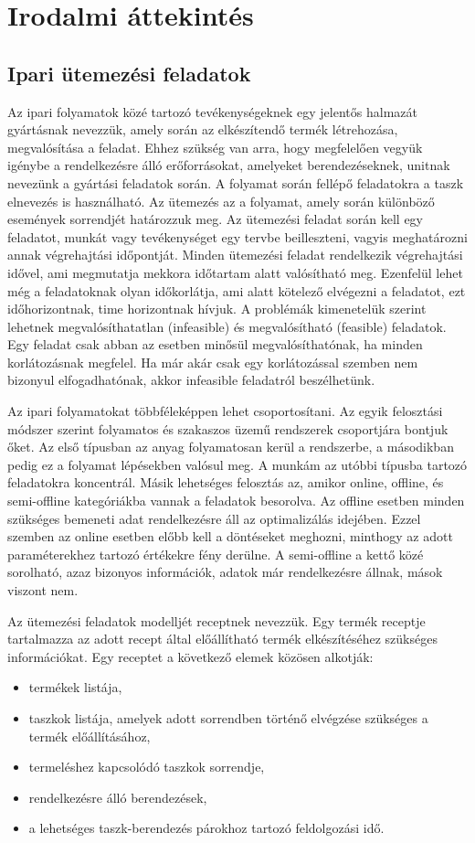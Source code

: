 \chapter{Irodalmi áttekintés}
\section{Ipari ütemezési feladatok}
Az ipari folyamatok közé tartozó tevékenységeknek egy jelentős halmazát gyártásnak nevezzük, amely során az elkészítendő termék létrehozása, megvalósítása a feladat.
Ehhez szükség van arra, hogy megfelelően vegyük igénybe a rendelkezésre álló erőforrásokat, amelyeket berendezéseknek, unitnak nevezünk a gyártási feladatok során.
A folyamat során fellépő feladatokra a taszk elnevezés is használható.
Az ütemezés az a folyamat, amely során különböző események sorrendjét határozzuk meg.
Az ütemezési feladat során kell egy feladatot, munkát vagy tevékenységet egy tervbe beilleszteni, vagyis meghatározni annak végrehajtási időpontját.
Minden ütemezési feladat rendelkezik végrehajtási idővel, ami megmutatja mekkora időtartam alatt valósítható meg.
Ezenfelül lehet még a feladatoknak olyan időkorlátja, ami alatt kötelező elvégezni a feladatot, ezt időhorizontnak, time horizontnak hívjuk.
A problémák kimenetelük szerint lehetnek megvalósíthatatlan (infeasible) és megvalósítható (feasible) feladatok.
Egy feladat csak abban az esetben minősül megvalósíthatónak, ha minden korlátozásnak megfelel.
Ha már akár csak egy korlátozással szemben nem bizonyul elfogadhatónak, akkor infeasible feladatról beszélhetünk.

Az ipari folyamatokat többféleképpen lehet csoportosítani.
Az egyik felosztási módszer szerint folyamatos és szakaszos üzemű rendszerek csoportjára bontjuk őket.
Az első típusban az anyag folyamatosan kerül a rendszerbe, a másodikban pedig ez a folyamat lépésekben valósul meg.
A munkám az utóbbi típusba tartozó feladatokra koncentrál.
Másik lehetséges felosztás az, amikor online, offline, és semi-offline kategóriákba vannak a feladatok besorolva.
Az offline esetben minden szükséges bemeneti adat rendelkezésre áll az optimalizálás idejében.
Ezzel szemben az online esetben előbb kell a döntéseket meghozni, minthogy az adott paraméterekhez tartozó értékekre fény derülne.
A semi-offline a kettő közé sorolható, azaz bizonyos információk, adatok már rendelkezésre állnak, mások viszont nem.

Az ütemezési feladatok modelljét receptnek nevezzük.
Egy termék receptje tartalmazza az adott recept által előállítható termék elkészítéséhez szükséges információkat\cite{Hegyhati}.
Egy receptet a következő elemek közösen alkotják:
\begin{itemize}
  \item termékek listája,
  \item taszkok listája, amelyek adott sorrendben történő elvégzése szükséges a termék előállításához,
  \item termeléshez kapcsolódó taszkok sorrendje,
  \item rendelkezésre álló berendezések,
  \item a lehetséges taszk-berendezés párokhoz tartozó feldolgozási idő.
\end{itemize}

